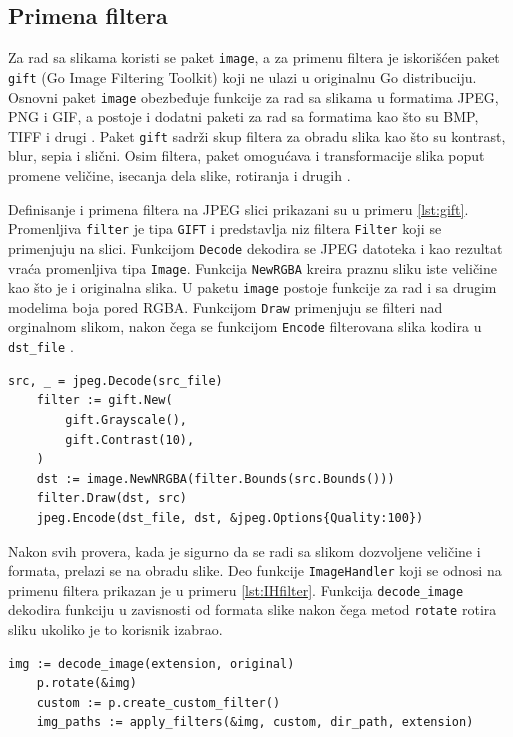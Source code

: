 \documentclass[12pt,oneside]{memoir}
\begin{document}
\subsection{Primena filtera}

Za rad sa slikama koristi se paket \texttt{image}, a za primenu filtera je iskorišćen paket \texttt{gift} (Go Image Filtering Toolkit) \cite{gift} koji ne ulazi u originalnu Go distribuciju. Osnovni paket \texttt{image} obezbeđuje funkcije za rad sa slikama u formatima JPEG, PNG i GIF, a postoje i dodatni paketi za rad sa formatima kao što su BMP, TIFF i drugi \cite{image}. Paket \texttt{gift}  sadrži skup filtera za obradu slika kao što su kontrast, blur, sepia i slični. Osim filtera, paket omogućava i transformacije slika poput promene veličine, isecanja dela slike, rotiranja i drugih \cite{gift}.

Definisanje i primena filtera na JPEG slici prikazani su u primeru \ref{lst:gift}. Promenljiva \texttt{filter} je tipa  \texttt{GIFT} i predstavlja niz filtera \texttt{Filter} koji se primenjuju na slici. Funkcijom \texttt{Decode} dekodira se JPEG datoteka i kao rezultat vraća promenljiva tipa  \texttt{Image}.  Funkcija \texttt{NewRGBA} kreira praznu sliku iste veličine kao što je i originalna slika. U paketu \texttt{image} postoje funkcije za rad i sa drugim modelima boja pored RGBA. Funkcijom  \texttt{Draw} primenjuju se filteri nad orginalnom slikom, nakon čega se funkcijom  \texttt{Encode} filterovana slika kodira u  \texttt{dst\_file} \cite{gift}.

\begin{center}
\begin{lstlisting}[caption=Definisanje i primena filtera,label={lst:gift},  backgroundcolor=\color{background}]
	src, _ = jpeg.Decode(src_file)
	filter := gift.New(
		gift.Grayscale(),
		gift.Contrast(10),
	)
	dst := image.NewNRGBA(filter.Bounds(src.Bounds()))
	filter.Draw(dst, src)
	jpeg.Encode(dst_file, dst, &jpeg.Options{Quality:100})
\end{lstlisting}
\end{center}

Nakon svih provera, kada je sigurno da se radi sa slikom dozvoljene veličine i formata, prelazi se na obradu slike. Deo funkcije  \texttt{ImageHandler} koji se odnosi na primenu filtera prikazan je u primeru \ref{lst:IHfilter}. Funkcija  \texttt{decode\_image} dekodira funkciju u zavisnosti od formata slike nakon čega metod  \texttt{rotate} rotira sliku ukoliko je to korisnik izabrao. 

\begin{center}
\begin{lstlisting}[caption=Primena filtera u funkciji ImageHandler,label={lst:IHfilter},  backgroundcolor=\color{background}]
	img := decode_image(extension, original)
	p.rotate(&img)
	custom := p.create_custom_filter()
	img_paths := apply_filters(&img, custom, dir_path, extension)
\end{lstlisting}
\end{center}
\end{document}
